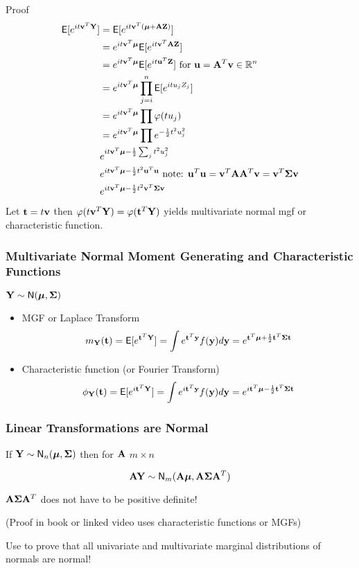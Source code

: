 \documentclass{beamer}
\begin{document}
\begin{frame}{Proof}
\begin{align*}
\textsf{E}[e^{i t\mathbf{v}^T\mathbf{Y}}] & =\textsf{E}[e^{i t \mathbf{v}^T(\boldsymbol{\mu} + \mathbf{A} \mathbf{Z})}]  \\
                & = e^{i t \mathbf{v}^T{\boldsymbol{\mu}}} \textsf{E}[e^{it \mathbf{v}^T\mathbf{A} \mathbf{Z}}]  \\
                & =  e^{i t \mathbf{v}^T{\boldsymbol{\mu}}} \textsf{E}[e^{it \mathbf{u}^T \mathbf{Z}}] \text{ for } \mathbf{u} = \mathbf{A}^T\mathbf{v} \in \mathbb{R}^n  \\
                & =  e^{i t \mathbf{v}^T{\boldsymbol{\mu}}} \prod_{j = i}^n\textsf{E}[e^{it u_j Z_j}]  \\
                 & =  e^{i t \mathbf{v}^T{\boldsymbol{\mu}}} \prod \varphi(t u_j)   \\
                   & =  e^{i t \mathbf{v}^T{\boldsymbol{\mu}}} \prod e^{- \frac 1 2 t^2 u_j^2}  \\
                   & e^{i t \mathbf{v}^T \boldsymbol{\mu}   - \frac 1 2 \sum_j t^2 u_j^2}   \\
                   & e^{i t \mathbf{v}^T \boldsymbol{\mu} - \frac 1 2 t^2 \mathbf{u}^T\mathbf{u}}  \text{ note: } \mathbf{u}^T\mathbf{u} = \mathbf{v}^T\mathbf{A}\mathbf{A}^T\mathbf{v} = \mathbf{v}^T\boldsymbol{\Sigma} \mathbf{v} \\
                   &  e^{i t \mathbf{v}^T \boldsymbol{\mu} - \frac 1 2 t^2 \mathbf{v}^T\boldsymbol{\Sigma} \mathbf{v} }
\end{align*}
 \pause
Let $\mathbf{t} = t \mathbf{v}$ then $\varphi(t \mathbf{v}^T \mathbf{Y}) = \varphi(\mathbf{t}^T \mathbf{Y})$ yields multivariate normal mgf or characteristic function.
\end{frame}

\begin{frame} \frametitle{Multivariate Normal Moment Generating and Characteristic Functions}

$\mathbf{Y} \sim \textsf{N}(\boldsymbol{\mu}, \boldsymbol{\Sigma})$

\begin{itemize}
  \item MGF or Laplace Transform
  $$m_{\mathbf{Y}}(\mathbf{t}) = \textsf{E}[e^{\mathbf{t}^T\mathbf{Y}}]
  = \int e^{\mathbf{t}^T\mathbf{y}} f(\mathbf{y})  d\mathbf{y}
= e^{\mathbf{t}^T\boldsymbol{\mu} + \frac{1}{2} \mathbf{t}^T \boldsymbol{\Sigma} \mathbf{t}}
  $$

  \item Characteristic function (or Fourier Transform)
  $$\phi_{\mathbf{Y}}(\mathbf{t}) = \textsf{E}[e^{i \mathbf{t}^T\mathbf{Y}}]
  = \int e^{ i \mathbf{t}^T\mathbf{y}} f(\mathbf{y})  d\mathbf{y}
= e^{i \mathbf{t}^T\boldsymbol{\mu}  - \frac{1}{2} \mathbf{t}^T \boldsymbol{\Sigma} \mathbf{t}}
  $$
\end{itemize}
\end{frame}

\begin{frame} \frametitle{Linear Transformations are Normal}

If $\mathbf{Y} \sim \textsf{N}_n(\boldsymbol{\mu}, \boldsymbol{\Sigma})$  \pause then for $\mathbf{A}$ $m \times n$

$$\mathbf{A} \mathbf{Y} \sim \textsf{N}_m(\mathbf{A} \boldsymbol{\mu}, \mathbf{A} \boldsymbol{\Sigma} \mathbf{A}^T)$$ \pause


$\mathbf{A} \boldsymbol{\Sigma} \mathbf{A}^T$ does not have to be positive definite! \pause

(Proof in book or linked video uses characteristic functions or MGFs)


\vspace{.5in}

Use to prove that all univariate and multivariate  marginal distributions of normals are normal!


\end{frame}
\end{document}
